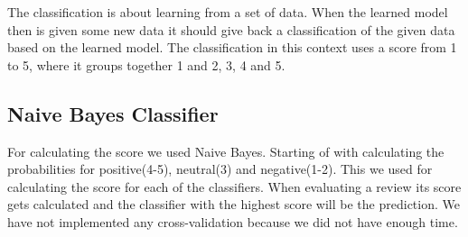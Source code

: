 The classification is about learning from a set of data.
When the learned model then is given some new data it should give back a classification of the given data based on the learned model.
The classification in this context uses a score from 1 to 5, where it groups together 1 and 2, 3, 4 and 5.
\subsection{Naive Bayes Classifier}
For calculating the score we used Naive Bayes.
Starting of with calculating the probabilities for positive(4-5), neutral(3) and negative(1-2).
This we used for calculating the score for each of the classifiers.
When evaluating a review its score gets calculated and the classifier with the highest score will be the prediction.
We have not implemented any cross-validation because we did not have enough time.
